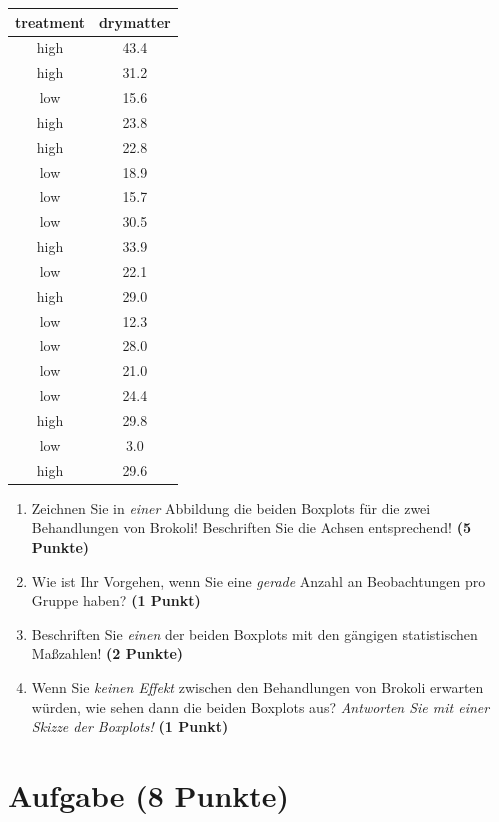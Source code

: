 \documentclass[a4paper, 9pt]{scrartcl}\usepackage[]{graphicx}\usepackage[]{xcolor}
\begin{document}
\begin{table}[!h]
\centering
\begin{tabular}{cc}
\toprule
treatment & drymatter\\
\midrule
high & 43.4\\
high & 31.2\\
low & 15.6\\
high & 23.8\\
high & 22.8\\
\addlinespace
low & 18.9\\
low & 15.7\\
low & 30.5\\
high & 33.9\\
low & 22.1\\
\addlinespace
high & 29.0\\
low & 12.3\\
low & 28.0\\
low & 21.0\\
low & 24.4\\
\addlinespace
high & 29.8\\
low & 3.0\\
high & 29.6\\
\bottomrule
\end{tabular}
\end{table}



\begin{enumerate}
\item Zeichnen Sie in \textit{einer} Abbildung die beiden Boxplots f{\"u}r die
  zwei Behandlungen von Brokoli! Beschriften Sie die Achsen entsprechend!
  \textbf{(5 Punkte)} 
\item Wie ist Ihr Vorgehen, wenn Sie eine \textit{gerade} Anzahl an
  Beobachtungen pro Gruppe haben? \textbf{(1 Punkt)}
\item Beschriften Sie \textit{einen} der beiden Boxplots mit den g{\"a}ngigen
  statistischen Ma{\ss}zahlen! \textbf{(2 Punkte)}
\item Wenn Sie \textit{keinen Effekt} zwischen den Behandlungen von
  Brokoli erwarten w{\"u}rden, wie sehen dann die beiden Boxplots aus?
  \textit{Antworten Sie mit einer Skizze der Boxplots!}
  \textbf{(1 Punkt)}
\end{enumerate} 
\clearpage

\section{Aufgabe \hfill (8 Punkte)}
\end{document}
